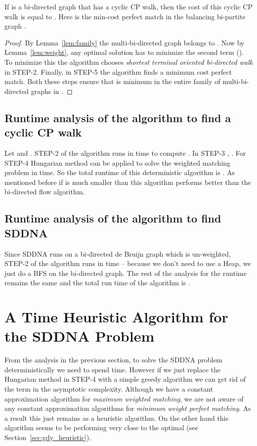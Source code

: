 \documentclass[runningheads]{llncs}
\begin{document}
\begin{theorem}
\label{thm:thm1}
If  is a bi-directed graph that has a cyclic CP walk, then the cost of this cyclic CP walk is equal to 
. Here
 is the min-cost perfect match in the balancing bi-partite graph .
\end{theorem}
\begin{proof}
By Lemma~\ref{lem:family} the multi-bi-directed graph  belongs to . Now by Lemma~\ref{lem:weight},
any optimal solution has to minimize the second term (). To minimize this the
algorithm chooses {\em shortest terminal oriented bi-directed walk} in {\sf STEP-2}. Finally, in {\sf STEP-5} the 
algorithm finds a minimum cost perfect match. Both these steps ensure that  is minimum in the entire
family of multi-bi-directed graphs in .
\end{proof}

\subsection{Runtime analysis of the algorithm to find a cyclic CP walk}
Let  and .
{\sf STEP-2} of the algorithm runs in  time to compute . In 
{\sf STEP-3}  , . For {\sf STEP-4} Hungarian method can be applied
to solve the weighted matching problem in  time. So the total runtime of this
deterministic algorithm is . As mentioned before
if  is much smaller than  this algorithm performs better than the bi-directed flow algorithm.
\subsection{Runtime analysis of the algorithm to find SDDNA}
Since SDDNA runs on a bi-directed de Bruijn graph which is un-weighted, {\sf STEP-2} of the algorithm
runs in  time -- because we don't need to use a Heap, we just do a BFS on the bi-directed
graph. The rest of the analysis for the runtime remains the same and the total run time of the algorithm 
is .


\section{A  Time Heuristic Algorithm for the SDDNA Problem}
\label{sec:gdy_algo}
From the analysis in the previous section, to solve the SDDNA problem deterministically we need to spend
 time. However if we just replace the Hungarian method in {\sf STEP-4}
with a simple greedy algorithm we can get rid of the  term in the asymptotic complexity.
Although we have a constant  approximation algorithm for {\em maximum weighted matching},
we are not aware of any constant approximation algorithms for {\em minimum weight perfect matching}.
As a result this just remains as a heuristic algorithm. On the other hand this algorithm seems to be
performing very close to the optimal (see Section~\ref{sec:gdy_heuristic}).
\end{document}
